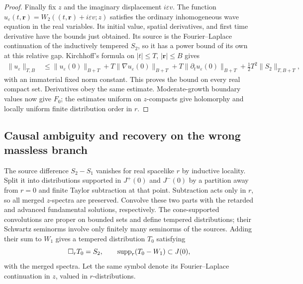 \begin{proof}
Finally fix $z$ and the imaginary displacement $i\varepsilon v$.
The function
$u_\varepsilon(t,\mathbf r)=W_2((t,\mathbf r)+i\varepsilon v;z)$
satisfies the ordinary inhomogeneous wave equation in the real
variables.  Its initial value, spatial derivatives, and first time
derivative have the bounds just obtained.  Its source is the
Fourier--Laplace continuation of the inductively tempered $S_2$,
so it has a power bound of its own at this relative gap.  Kirchhoff's
formula on $|t|\leq T$, $|\mathbf r|\leq B$ gives
\begin{align}\label{R:wave-estimate}
 \|u_\varepsilon\|_{T,B}
 &\leq \|u_\varepsilon(0)\|_{B+T}
   +T\|\nabla u_\varepsilon(0)\|_{B+T}
   +T\|\partial_tu_\varepsilon(0)\|_{B+T}
   +\tfrac12T^2\|S_2\|_{T,B+T},
\end{align}
with an immaterial fixed norm constant.  This proves the bound on
every real compact set.  Derivatives obey the same estimate.
Moderate-growth boundary values now give $F_0$; the estimates uniform
on $z$-compacts give holomorphy and locally uniform finite distribution
order in $r$.
\end{proof}

\subsection{Causal ambiguity and recovery on the wrong massless branch}

The source difference $S_2-S_1$ vanishes for real spacelike $r$ by
inductive locality.  Split it into distributions supported in
$J^+(0)$ and $J^-(0)$ by a partition away from $r=0$ and finite Taylor
subtraction at that point.  Subtraction acts only in $r$, so all
merged $z$-spectra are preserved.  Convolve these two parts with the
retarded and advanced fundamental solutions, respectively.  The
cone-supported convolutions are proper on bounded sets and define
tempered distributions; their Schwartz seminorms involve only
finitely many seminorms of the sources.  Adding their sum to $W_1$
gives a tempered distribution $T_0$ satisfying
\begin{equation}\label{R:causal-solution}
 \Box_r T_0=S_2,\qquad
 \operatorname{supp}_r(T_0-W_1)\subset J(0),
\end{equation}
with the merged spectra.  Let the same symbol denote its
Fourier--Laplace continuation in $z$, valued in $r$-distributions.

